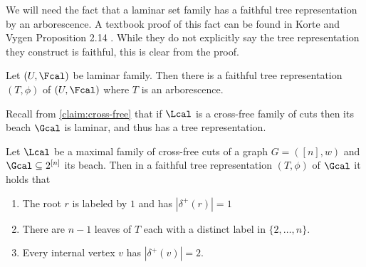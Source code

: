 We will need the fact that a laminar set family has a faithful tree representation by an arborescence.  A textbook proof of this fact can be found
in Korte and Vygen Proposition 2.14 \cite{KV18}.  While they do not explicitly say the tree representation they construct is faithful,
this is clear from the proof.
\begin{proposition}
\label{prop:treerep}
Let $(U,\Fcal)$ be laminar family.  Then there is a faithful tree representation $(T,\phi)$ of $(U,\Fcal)$ where $T$ is an arborescence.
\end{proposition}

Recall from \cref{claim:cross-free} that if $\Lcal$ is a cross-free family of cuts then its beach $\Gcal$ is laminar, and thus has a tree representation.
\begin{lemma}
\label{lem:tree_structure}
Let $\Lcal$ be a maximal family of cross-free cuts of a graph $G= ([n],w)$ and $\Gcal \subseteq 2^{[n]}$ its beach.  Then in a faithful tree representation $(T,\phi)$ of $\Gcal$
it holds that
\begin{enumerate}
\item The root $r$ is labeled by $1$ and has $|\delta^+(r)| = 1$
\item There are $n-1$ leaves of $T$ each with a distinct label in $\{2, \ldots, n\}$.
\item Every internal vertex $v$ has $|\delta^+(v)| = 2$.
\end{enumerate}
\end{lemma}

